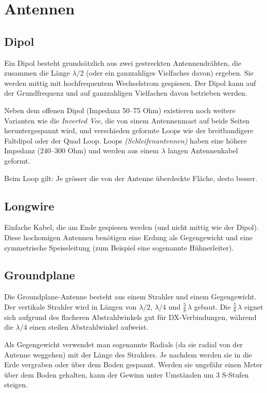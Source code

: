 \chapter{Antennen}

\section{Dipol} \label{sec:dipol}
Ein Dipol besteht grundsätzlich aus zwei gestreckten Antennendrähten, die zusammen die Länge $\lambda/2$ (oder ein ganzzahliges Vielfaches davon) ergeben. Sie werden mittig mit hochfrequentem Wechselstrom gespiesen. Der Dipol kann auf der Grundfrequenz und auf ganzzahligen Vielfachen davon betrieben werden.

Neben dem offenen Dipol (Impedanz 50–75 Ohm) existieren noch weitere Varianten wie die \textit{Inverted Vee}, die von einem Antennenmast auf beide Seiten heruntergespannt wird, und verschieden geformte Loops wie der breitbandigere Faltdipol oder der Quad Loop. Loops \textit{(Schleifenantennen)} haben eine höhere Impedanz (240–300 Ohm) und werden aus einem $\lambda$ langen Antennenkabel geformt.

Beim Loop gilt: Je grösser die von der Antenne überdeckte Fläche, desto besser.

\section{Longwire}
Einfache Kabel, die am Ende gespiesen werden (und nicht mittig wie der Dipol). Diese hochomigen Antennen benötigen eine Erdung als Gegengewicht und eine symmetrische Speiseleitung (zum Beispiel eine sogenannte Hühnerleiter). 

\section{Groundplane}
Die Groundplane-Antenne besteht aus einem Strahler und einem Gegengewicht. Der vertikale Strahler wird in Längen von $\lambda/2$, $\lambda/4$ und $\frac{5}{8}\,\lambda$ gebaut. Die $\frac{5}{8}\,\lambda$ eignet sich aufgrund des flacheren Abstrahlwinkels gut für DX-Verbindungen, während die  $\lambda/4$ einen steilen Abstrahlwinkel aufweist.

Als Gegengewicht verwendet man sogenannte Radials (da sie radial von der Antenne weggehen) mit der Länge des Strahlers. Je nachdem werden sie in die Erde vergraben oder über dem Boden gespannt. Werden sie ungefähr einen Meter über dem Boden gehalten, kann der Gewinn unter Umständen um 3 S-Stufen steigen.


